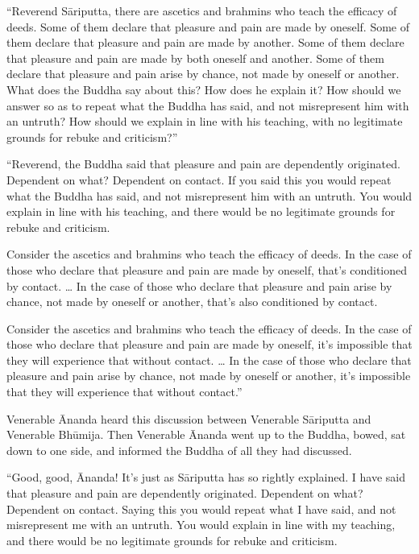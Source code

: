 \documentclass[12pt,openany]{book}%
\begin{document}
“Reverend \textsanskrit{Sāriputta}, there are ascetics and brahmins who teach the efficacy of deeds. Some of them declare that pleasure and pain are made by oneself. Some of them declare that pleasure and pain are made by another. Some of them declare that pleasure and pain are made by both oneself and another. Some of them declare that pleasure and pain arise by chance, not made by oneself or another. What does the Buddha say about this? How does he explain it? How should we answer so as to repeat what the Buddha has said, and not misrepresent him with an untruth? How should we explain in line with his teaching, with no legitimate grounds for rebuke and criticism?” 

“Reverend, the Buddha said that pleasure and pain are dependently originated. Dependent on what? Dependent on contact. If you said this you would repeat what the Buddha has said, and not misrepresent him with an untruth. You would explain in line with his teaching, and there would be no legitimate grounds for rebuke and criticism. 

Consider the ascetics and brahmins who teach the efficacy of deeds. In the case of those who declare that pleasure and pain are made by oneself, that’s conditioned by contact. … In the case of those who declare that pleasure and pain arise by chance, not made by oneself or another, that’s also conditioned by contact. 

Consider the ascetics and brahmins who teach the efficacy of deeds. In the case of those who declare that pleasure and pain are made by oneself, it’s impossible that they will experience that without contact. … In the case of those who declare that pleasure and pain arise by chance, not made by oneself or another, it’s impossible that they will experience that without contact.” 

Venerable Ānanda heard this discussion between Venerable \textsanskrit{Sāriputta} and Venerable \textsanskrit{Bhūmija}. Then Venerable Ānanda went up to the Buddha, bowed, sat down to one side, and informed the Buddha of all they had discussed. 

“Good, good, Ānanda! It’s just as \textsanskrit{Sāriputta} has so rightly explained. I have said that pleasure and pain are dependently originated. Dependent on what? Dependent on contact. Saying this you would repeat what I have said, and not misrepresent me with an untruth. You would explain in line with my teaching, and there would be no legitimate grounds for rebuke and criticism. 
\end{document}
